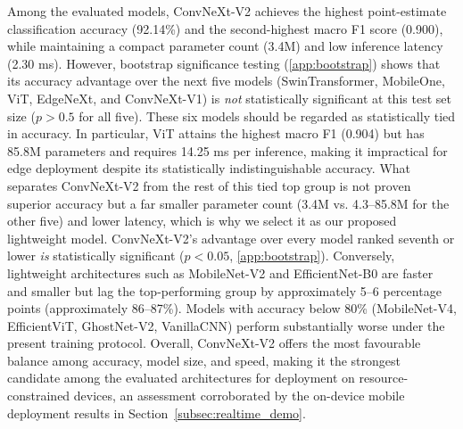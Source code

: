 Among the evaluated models, ConvNeXt-V2 achieves the highest point-estimate classification accuracy (92.14\%) and the second-highest macro F1 score (0.900), while maintaining a compact parameter count (3.4M) and low inference latency (2.30 ms). However, bootstrap significance testing (\ref{app:bootstrap}) shows that its accuracy advantage over the next five models (SwinTransformer, MobileOne, ViT, EdgeNeXt, and ConvNeXt-V1) is \emph{not} statistically significant at this test set size ($p > 0.5$ for all five). These six models should be regarded as statistically tied in accuracy. In particular, ViT attains the highest macro F1 (0.904) but has 85.8M parameters and requires 14.25 ms per inference, making it impractical for edge deployment despite its statistically indistinguishable accuracy. What separates ConvNeXt-V2 from the rest of this tied top group is not proven superior accuracy but a far smaller parameter count (3.4M vs. 4.3--85.8M for the other five) and lower latency, which is why we select it as our proposed lightweight model. ConvNeXt-V2's advantage over every model ranked seventh or lower \emph{is} statistically significant ($p < 0.05$, \ref{app:bootstrap}). Conversely, lightweight architectures such as MobileNet-V2 and EfficientNet-B0 are faster and smaller but lag the top-performing group by approximately 5–6 percentage points (approximately 86–87\%). Models with accuracy below 80\% (MobileNet-V4, EfficientViT, GhostNet-V2, VanillaCNN) perform substantially worse under the present training protocol. Overall, ConvNeXt-V2 offers the most favourable balance among accuracy, model size, and speed, making it the strongest candidate among the evaluated architectures for deployment on resource-constrained devices, an assessment corroborated by the on-device mobile deployment results in Section~\ref{subsec:realtime_demo}.

